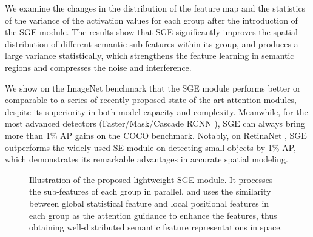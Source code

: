 \documentclass{article}
\begin{document}
	We examine the changes in the distribution of the feature map and the statistics of the variance of the activation values for each group after the introduction of the SGE module. The results show that SGE significantly improves the spatial distribution of different semantic sub-features within its group, and produces a large variance statistically, which strengthens the feature learning in semantic regions and compresses the noise and interference.
	
	We show on the ImageNet \cite{russakovsky2015imagenet} benchmark that the SGE module performs better or comparable to a series of recently proposed state-of-the-art attention modules, despite its superiority in both model capacity and complexity. Meanwhile, for the most advanced detectors (Faster/Mask/Cascade RCNN \cite{ren2015faster,he2017mask,cai2018cascade}), SGE can always bring more than 1\% AP gains on the COCO \cite{lin2014microsoft} benchmark. Notably, on RetinaNet \cite{lin2017focal}, SGE outperforms the widely used SE \cite{hu2018squeeze} module on detecting small objects by 1\% AP, which demonstrates its remarkable advantages in accurate spatial modeling.
	\begin{figure}[t]
		\begin{center}
			\setlength{\fboxrule}{0pt}
		\end{center}	
		\vspace{-8pt}
		\caption{Illustration of the proposed lightweight SGE module. It processes the sub-features of each group in parallel, and uses the similarity between global statistical feature and local positional features in each group as the attention guidance to enhance the features, thus obtaining well-distributed semantic feature representations in space.}
		\label{fig_sge}
		\vspace{-8pt}
	\end{figure}
\end{document}
